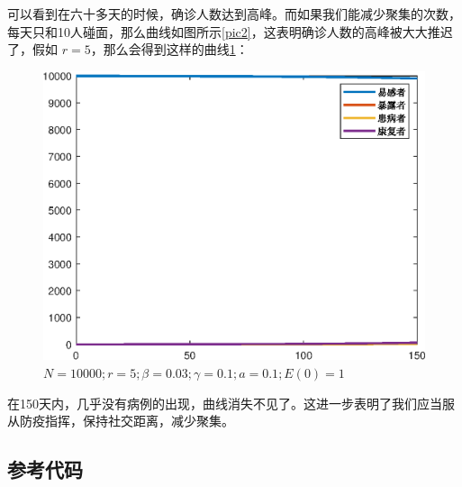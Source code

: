 \documentclass{ctexart}
\numberwithin{equation}{section}    %
\begin{document}
可以看到在六十多天的时候，确诊人数达到高峰。而如果我们能减少聚集的次数，每天只和10人碰面，那么曲线如图所示\ref{pic2}，这表明确诊人数的高峰被大大推迟了，假如 $r=5$，那么会得到这样的曲线\ref{pic3}：

\begin{figure}[htbp]
    \centering
    \includegraphics[width=0.5\linewidth]{fig/r=5}
    \caption{$N = 10000;r = 5;\beta = 0.03;\gamma = 0.1;a = 0.1;E(0)=1$}
    \label{pic3}
\end{figure}

在150天内，几乎没有病例的出现，曲线消失不见了。这进一步表明了我们应当服从防疫指挥，保持社交距离，减少聚集。
\clearpage
\begin{appendices}
\section{参考代码}


\end{appendices}
\end{document}

